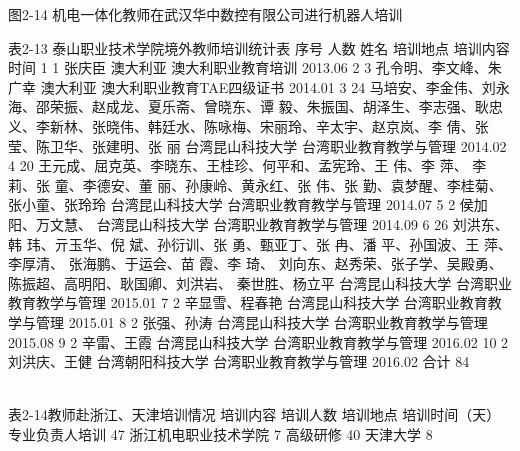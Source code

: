 图2-14  机电一体化教师在武汉华中数控有限公司进行机器人培训

表2-13 泰山职业技术学院境外教师培训统计表
序号
人数
姓名
培训地点
培训内容
时间
1
1
张庆臣
澳大利亚
澳大利职业教育培训
2013.06
2
3
孔令明、李文峰、朱广幸
澳大利亚
澳大利职业教育TAE四级证书
2014.01
3
24
马培安、李金伟、刘永海、邵荣振、赵成龙、夏乐斋、曾晓东、谭  毅、朱振国、胡泽生、李志强、耿忠义、李新林、张晓伟、韩廷水、陈咏梅、宋丽玲、辛太宇、赵京岚、李  倩、张  莹、陈卫华、张建明、张  丽
台湾昆山科技大学
台湾职业教育教学与管理
2014.02
4
20
王元成、屈克英、李晓东、王桂珍、何平和、孟宪玲、王  伟、李  萍、 李  莉、张  童、李德安、董  丽、孙康岭、黄永红、张  伟、张  勤、袁梦醒、李桂菊、张小童、张玲玲
台湾昆山科技大学
台湾职业教育教学与管理
2014.07
5
2
侯加阳、万文慧、
台湾昆山科技大学
台湾职业教育教学与管理
2014.09
6
26
刘洪东、韩  玮、亓玉华、倪   斌、孙衍训、张  勇、甄亚丁、张   冉、潘  平、孙国波、王  萍、李厚清、 张海鹏、于运会、苗  霞、李  琦、 刘向东、赵秀荣、张子学、吴殿勇、 陈振超、高明阳、耿国卿、刘洪岩、 秦世胜、杨立平
台湾昆山科技大学
台湾职业教育教学与管理
2015.01
7
2
辛显雪、程春艳
台湾昆山科技大学
台湾职业教育教学与管理
2015.01
8
2
张强、孙涛
台湾昆山科技大学
台湾职业教育教学与管理
2015.08
9
2
辛雷、王霞
台湾昆山科技大学
台湾职业教育教学与管理
2016.02
10
2
刘洪庆、王健
台湾朝阳科技大学
台湾职业教育教学与管理
2016.02
合计
84
　
　
　
　

表2-14教师赴浙江、天津培训情况
培训内容
培训人数
培训地点
培训时间（天）
专业负责人培训
47
浙江机电职业技术学院
7
高级研修
40
天津大学
8


